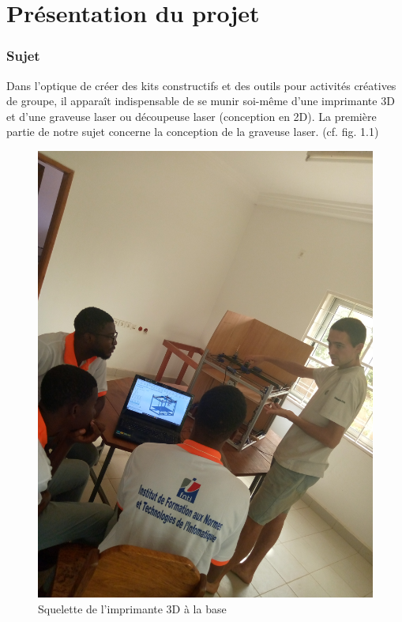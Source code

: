 \part{Présentation du projet}

\section{Sujet}

Dans l'optique de créer des kits constructifs et des  outils  pour  activités  créatives  de  groupe, il apparaît indispensable de se munir soi-même d'une imprimante 3D et d'une graveuse laser ou découpeuse laser (conception en 2D). La première partie de notre sujet concerne la conception de la graveuse laser. (cf. fig. 1.1)%
\begin{figure}[!h]
\begin{center}
\includegraphics[width=13cm]{presentation/schema}
\end{center}
\caption{Squelette de l'imprimante 3D à la base}
\end{figure}\\

